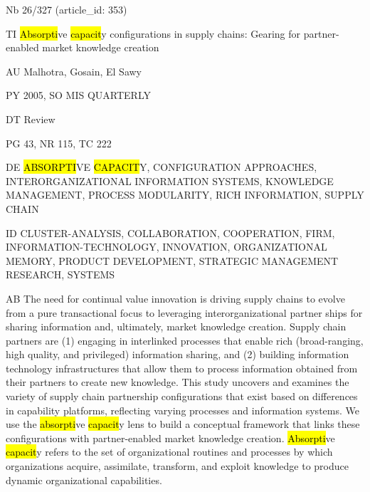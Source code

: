 \documentclass[a4paper]{article}
\begin{document}
\vspace*{-2cm}
Nb \tabto{0cm}26/327 (article\_id: 353)\par
TI \tabto{0cm}\hl{Absorpti}ve \hl{capacit}y configurations in supply chains: Gearing for partner-enabled market knowledge creation\par
AU \tabto{0cm}Malhotra, Gosain, El Sawy\par
PY \tabto{0cm}2005, SO MIS QUARTERLY\par
DT \tabto{0cm}Review\par
PG \tabto{0cm}43, NR 115, TC 222\par
DE \tabto{0cm}\hl{ABSORPTI}VE \hl{CAPACIT}Y, CONFIGURATION APPROACHES, INTERORGANIZATIONAL INFORMATION SYSTEMS, KNOWLEDGE MANAGEMENT, PROCESS MODULARITY, RICH INFORMATION, SUPPLY CHAIN\par
ID \tabto{0cm}CLUSTER-ANALYSIS, COLLABORATION, COOPERATION, FIRM, INFORMATION-TECHNOLOGY, INNOVATION, ORGANIZATIONAL MEMORY, PRODUCT DEVELOPMENT, STRATEGIC MANAGEMENT RESEARCH, SYSTEMS\par
AB \tabto{0cm}The need for continual value innovation is driving supply chains to evolve from a pure transactional focus to leveraging interorganizational partner ships for sharing information and, ultimately, market knowledge creation. Supply chain partners are (1) engaging in interlinked processes that enable rich (broad-ranging, high quality, and privileged) information sharing, and (2) building information technology infrastructures that allow them to process information obtained from their partners to create new knowledge. This study uncovers and examines the variety of supply chain partnership configurations that exist based on differences in capability platforms, reflecting varying processes and information systems. We use the \hl{absorpti}ve \hl{capacit}y lens to build a conceptual framework that links these configurations with partner-enabled market knowledge creation. \hl{Absorpti}ve \hl{capacit}y refers to the set of organizational routines and processes by which organizations acquire, assimilate, transform, and exploit knowledge to produce dynamic organizational capabilities.
\end{document}
